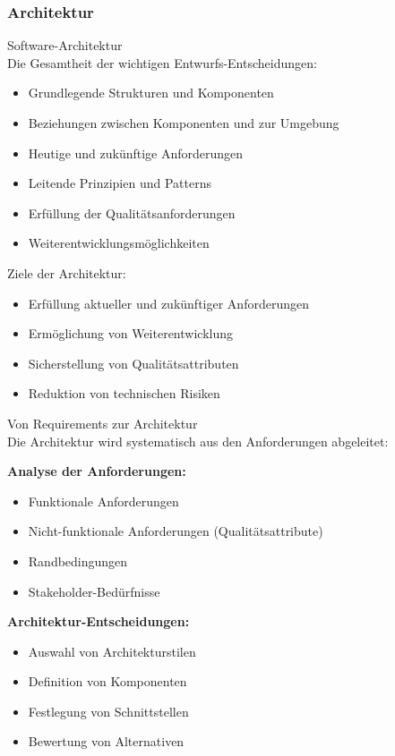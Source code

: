 \columnbreak

\subsubsection{Architektur}

\begin{definition}{Software-Architektur}\\
Die Gesamtheit der wichtigen Entwurfs-Entscheidungen:
\begin{itemize}
    \item Grundlegende Strukturen und Komponenten
    \item Beziehungen zwischen Komponenten und zur Umgebung
    \item Heutige und zukünftige Anforderungen
    \item Leitende Prinzipien und Patterns
    \item Erfüllung der Qualitätsanforderungen
    \item Weiterentwicklungsmöglichkeiten
\end{itemize}

Ziele der Architektur:
\begin{itemize}
    \item Erfüllung aktueller und zukünftiger Anforderungen
    \item Ermöglichung von Weiterentwicklung
    \item Sicherstellung von Qualitätsattributen
    \item Reduktion von technischen Risiken
\end{itemize}
\end{definition}

\begin{concept}{Von Requirements zur Architektur}\\
Die Architektur wird systematisch aus den Anforderungen abgeleitet:

\textbf{Analyse der Anforderungen:}
\begin{itemize}
    \item Funktionale Anforderungen
    \item Nicht-funktionale Anforderungen (Qualitätsattribute)
    \item Randbedingungen
    \item Stakeholder-Bedürfnisse
\end{itemize}

\textbf{Architektur-Entscheidungen:}
\begin{itemize}
    \item Auswahl von Architekturstilen
    \item Definition von Komponenten
    \item Festlegung von Schnittstellen
    \item Bewertung von Alternativen
\end{itemize}
\end{concept}

